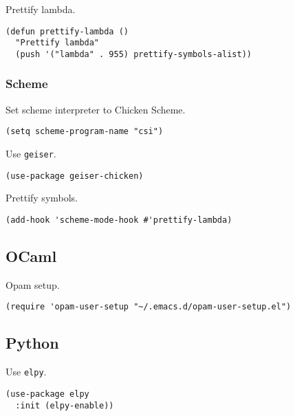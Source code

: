 \documentclass[11pt]{article}
\begin{document}
Prettify lambda.
\begin{verbatim}
(defun prettify-lambda ()
  "Prettify lambda"
  (push '("lambda" . 955) prettify-symbols-alist))
\end{verbatim}

\subsubsection{Scheme}
\label{sec:orgd2863ff}
Set scheme interpreter to Chicken Scheme.
\begin{verbatim}
(setq scheme-program-name "csi")
\end{verbatim}

Use \texttt{geiser}.
\begin{verbatim}
(use-package geiser-chicken)
\end{verbatim}

Prettify symbols.
\begin{verbatim}
(add-hook 'scheme-mode-hook #'prettify-lambda)
\end{verbatim}

\subsection{OCaml}
\label{sec:org97de35d}
Opam setup.
\begin{verbatim}
(require 'opam-user-setup "~/.emacs.d/opam-user-setup.el")
\end{verbatim}

\subsection{Python}
\label{sec:org7a0f73b}
Use \texttt{elpy}.
\begin{verbatim}
(use-package elpy
  :init (elpy-enable))
\end{verbatim}
\end{document}
